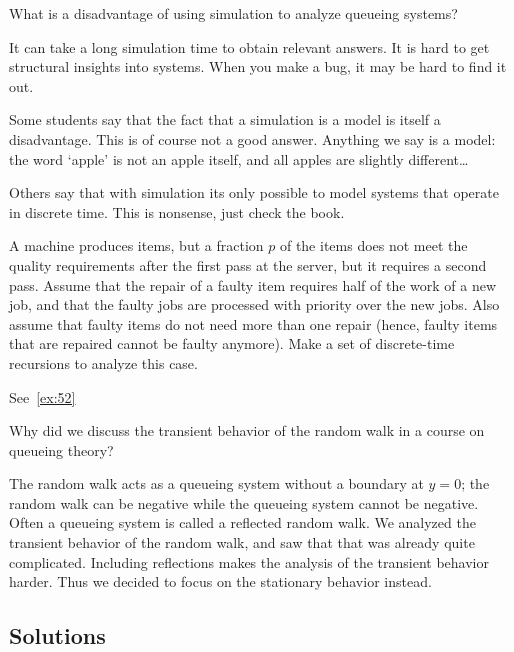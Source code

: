 \begin{exercise}[201807]
  What is a disadvantage of using simulation to analyze queueing systems?
\begin{solution}
    It can take a long simulation time to obtain relevant answers. It is hard to get structural insights into systems. When you make a bug, it may be hard to find it out.

Some students say that the fact that a simulation is a model is itself a disadvantage. This is of course not a good answer. Anything we say is a model: the word `apple' is not an apple itself, and all apples are slightly different\ldots 

Others say that with simulation its only possible to model systems that operate in discrete time. This is nonsense, just check the book. 
\end{solution}
\end{exercise}


\begin{exercise}[201904]
  A machine produces items, but a fraction $p$ of the items does not meet the quality requirements after the first pass at the server, but it requires a second pass.
  Assume that the repair of a faulty item requires half of the work of a new job, and that the faulty jobs are processed with priority over the new jobs.
  Also assume that faulty items do not need more than one repair (hence, faulty items that are repaired cannot be faulty anymore).
  Make a set of discrete-time recursions to analyze this case.
\begin{solution}
See~\cref{ex:52}
\end{solution}
\end{exercise}


\begin{exercise}[201907]
  Why did we discuss the transient behavior of the random walk in a course on queueing theory?   

\begin{solution}
  The random walk acts as a queueing system without a boundary at $y=0$; the random walk can be negative while the queueing system cannot be negative.
  Often a queueing system is called a reflected random walk.
  We analyzed the transient behavior of the random walk, and saw that that was already quite complicated.
  Including reflections makes the analysis of the transient behavior harder.
  Thus we decided to focus on the stationary behavior instead.
\end{solution}
\end{exercise}



\subsection*{Solutions}




